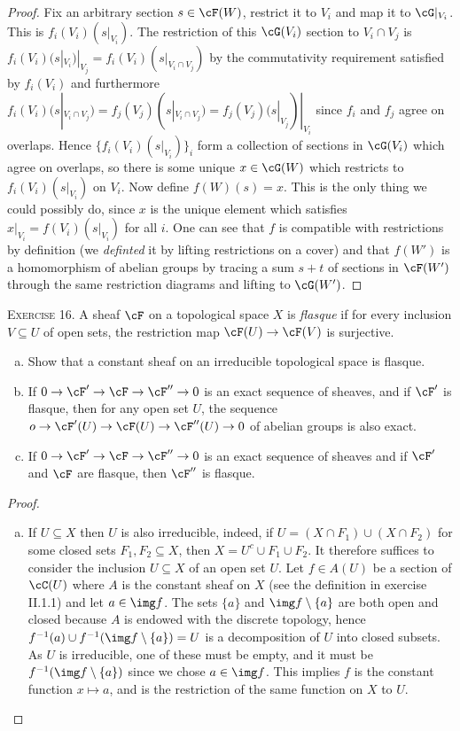 \begin{problemset}
\begin{proof}
		Fix an arbitrary section $s \in \cF(W)$, restrict it to $V_i$ and map it to $\cG|_{V_i}$. This is $f_i(V_i)(s|_{V_i})$. The restriction of this $\cG(V_i)$ section to $V_i\cap V_j$ is $f_i(V_i)(s|_{V_i})|_{V_j} = f_i(V_i)(s|_{V_i\cap V_j})$ by the commutativity requirement satisfied by $f_i(V_i)$ and furthermore $f_i(V_i)(s|_{V_i\cap V_j}) = f_j(V_j)(s|_{V_i\cap V_j}) = f_j(V_j)(s|_{V_j})|_{V_i}$ since $f_i$ and $f_j$ agree on overlaps. Hence $\{f_i(V_i)(s|_{V_i})\}_i$ form a collection of sections in $\cG(V_i)$ which agree on overlaps, so there is some unique $x \in \cG(W)$ which restricts to $f_i(V_i)(s|_{V_i})$ on $V_i$. Now define $f(W)(s) = x$. This is the only thing we could possibly do, since $x$ is the unique element which satisfies $x|_{V_i} = f(V_i)(s|_{V_i})$ for all $i$. One can see that $f$ is compatible with restrictions by definition (we \emph{definted} it by lifting restrictions on a cover) and that $f(W')$ is a homomorphism of abelian groups by tracing a sum $s + t$ of sections in $\cF(W')$ through the same restriction diagrams and lifting to $\cG(W')$.
	\end{proof}
	\item[\textsc{Exercise 16.}] A sheaf $\cF$ on a topological space $X$ is \emph{flasque} if for every inclusion $V\subseteq U$ of open sets, the restriction map $\cF(U) \to \cF(V)$ is surjective.
	\begin{enumerate}[(a)]
		\item Show that a constant sheaf on an irreducible topological space is flasque.
		\item If $0 \to \cF' \to \cF\to \cF''\to 0$ is an exact sequence of sheaves, and if $\cF'$ is flasque, then for any open set $U$, the sequence $o\to \cF'(U)\to \cF(U)\to \cF''(U)\to 0$ of abelian groups is also exact.
		\item If $0 \to \cF' \to \cF \to \cF''\to 0$ is an exact sequence of sheaves and if $\cF'$ and $\cF$ are flasque, then $\cF''$ is flasque.
	\end{enumerate}
	\begin{proof}$ $
		\begin{enumerate}[(a)]
			\item If $U \subseteq X$ then $U$ is also irreducible, indeed, if $U = (X\cap F_1)\cup (X \cap F_2)$ for some closed sets $F_1,F_2 \subseteq X$, then $X = U^c \cup F_1 \cup F_2$. It therefore suffices to consider the inclusion $U\subseteq X$ of an open set $U$. Let $f \in A(U)$ be a section of $\cC(U)$ where $A$ is the constant sheaf on $X$ (see the definition in exercise II.1.1) and let $a \in \img f$. The sets $\{a\}$ and $\img f\setminus \{a\}$ are both open and closed because $A$ is endowed with the discrete topology, hence $f^{-1}(a)\cup f^{-1}(\img f\setminus \{a\}) = U$ is a decomposition of $U$ into closed subsets. As $U$ is irreducible, one of these must be empty, and it must be $f^{-1}(\img f\setminus \{a\})$ since we chose $a\in \img f$. This implies $f$ is the constant function $x \mapsto a$, and is the restriction of the same function on $X$ to $U$.

\end{enumerate}
\end{proof}
\end{problemset}
